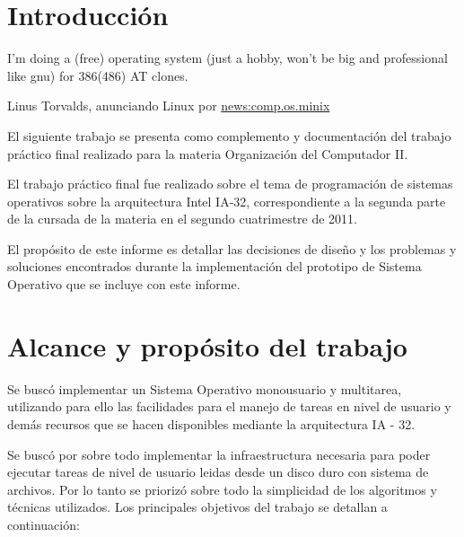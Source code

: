 \section{Introducci\'on}

\epigraph{I'm doing a (free) operating system (just a hobby, won't be big and professional like gnu) for 386(486) AT clones.}{Linus Torvalds,
anunciando Linux por \url{news:comp.os.minix} }

El siguiente trabajo se presenta como complemento y documentaci\'on
del trabajo pr\'actico final realizado para la materia Organizaci\'on
del Computador II. 

El trabajo pr\'actico final fue realizado sobre el tema de programaci\'on
de sistemas operativos sobre la arquitectura Intel IA-32, correspondiente
a la segunda parte de la cursada de la materia en el segundo cuatrimestre
de 2011.

El prop\'osito de este informe es detallar las decisiones de dise\~no
y los problemas y soluciones encontrados durante la implementaci\'on del
prototipo de Sistema Operativo que se incluye con este informe.

\section{Alcance y prop\'osito del trabajo}

Se busc\'o implementar un Sistema Operativo monousuario y multitarea,
utilizando para ello las facilidades para el manejo de tareas en nivel de
usuario y dem\'as recursos que se hacen disponibles mediante la arquitectura
IA - 32. 

Se busc\'o por sobre todo implementar la infraestructura necesaria para poder
ejecutar tareas de nivel de usuario leidas desde un disco duro con sistema de
archivos. Por lo tanto se prioriz\'o sobre todo la simplicidad de los algoritmos
y t\'ecnicas utilizados. Los principales objetivos del trabajo se detallan a
continuaci\'on:

